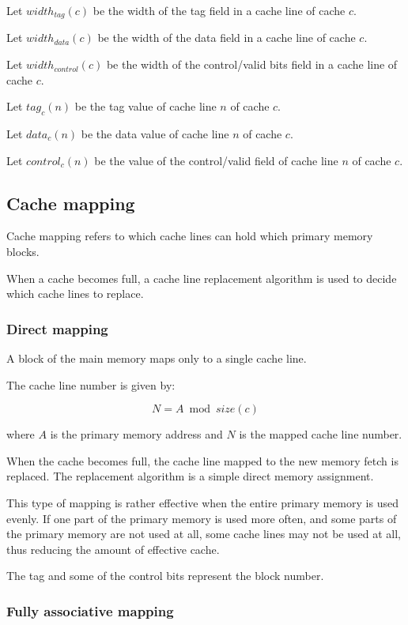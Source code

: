\documentclass{report}
\begin{document}
Let $width_{tag}(c)$ be the width of the tag field in a cache line of cache $c$.

Let $width_{data}(c)$ be the width of the data field in a cache line of cache
$c$.

Let $width_{control}(c)$ be the width of the control/valid bits field in a cache
line of cache $c$.

Let $tag_c(n)$ be the tag value of cache line $n$ of cache $c$.

Let $data_c(n)$ be the data value of cache line $n$ of cache $c$.

Let $control_c(n)$ be the value of the control/valid field of cache line $n$ of
cache $c$.

\subsection{Cache mapping}

Cache mapping refers to which cache lines can hold which primary memory blocks.

When a cache becomes full, a cache line replacement algorithm is used to decide
which cache lines to replace.

\subsubsection{Direct mapping}

A block of the main memory maps only to a single cache line.

The cache line number is given by:

\begin{equation}
    N = A \bmod size(c)
\end{equation}

where $A$ is the primary memory address and $N$ is the mapped cache line number.

When the cache becomes full, the cache line mapped to the new memory fetch is
replaced. The replacement algorithm is a simple direct memory assignment.

This type of mapping is rather effective when the entire primary memory is used
evenly. If one part of the primary memory is used more often, and some parts of
the primary memory are not used at all, some cache lines may not be used at all,
thus reducing the amount of effective cache.

The tag and some of the control bits represent the block number.

\subsubsection{Fully associative mapping}
\end{document}
